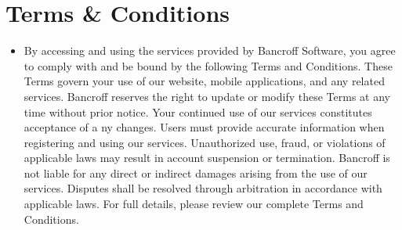 \documentclass{article}
\begin{document}
    \section{Terms \& Conditions}
    \begin{itemize}
        \item 
        By accessing and using the services provided by Bancroff Software, 
        you agree to comply with and be bound by the following Terms and 
        Conditions. These Terms govern your use of our website, 
        mobile applications, and any related services. Bancroff reserves
         the right to update or modify these Terms at any time without prior 
         notice. Your continued use of our services constitutes acceptance of a
         ny changes. Users must provide accurate information when registering 
         and using our services. Unauthorized use, fraud, or violations of 
         applicable laws may result in account suspension or termination. 
         Bancroff is not liable for any direct or indirect damages arising from 
         the use of our services. Disputes shall be resolved through 
         arbitration in accordance with applicable laws. 
        For full details, please review our complete Terms and Conditions.
    \end{itemize} 
\end{document}
